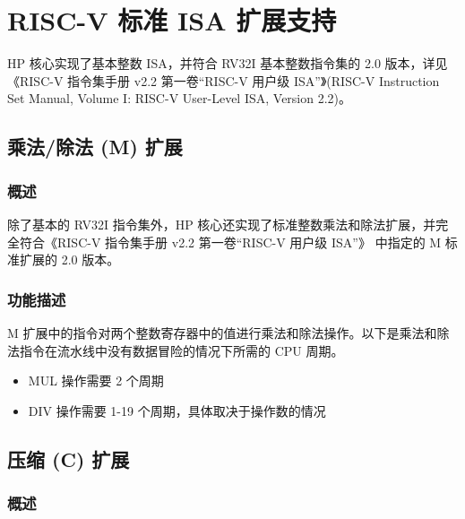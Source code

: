 \documentclass[main\_\_CN.tex]{subfiles}
\begin{document}


\newpage
\section{RISC-V 标准 ISA 扩展支持}

HP 核心实现了基本整数 ISA，并符合 RV32I 基本整数指令集的 2.0 版本，详见《RISC-V 指令集手册 v2.2 第一卷“RISC-V 用户级 ISA”》(RISC-V Instruction Set Manual, Volume I: RISC-V User-Level ISA, Version 2.2)。

\subsection{乘法/除法 (M) 扩展}
\label{sec:riscvcpu-mext}
\subsubsection{概述}
\label{sec:riscvcpu-mext-overview}
除了基本的 RV32I 指令集外，HP 核心还实现了标准整数乘法和除法扩展，并完全符合《RISC-V 指令集手册 v2.2 第一卷“RISC-V 用户级 ISA”》 中指定的 M 标准扩展的 2.0 版本。

\subsubsection{功能描述}

\label{sec:riscvcpu-mext-func-descr}
M 扩展中的指令对两个整数寄存器中的值进行乘法和除法操作。以下是乘法和除法指令在流水线中没有数据冒险的情况下所需的 CPU 周期。
\begin{itemize}
    \item MUL 操作需要 2 个周期
    \item DIV 操作需要 1-19 个周期，具体取决于操作数的情况
\end{itemize}


\subsection{压缩 (C) 扩展}
\label{sec:riscvcpu-cext}
\subsubsection{概述}

\label{sec:riscvcpu-cext-overview}
\end{document}
